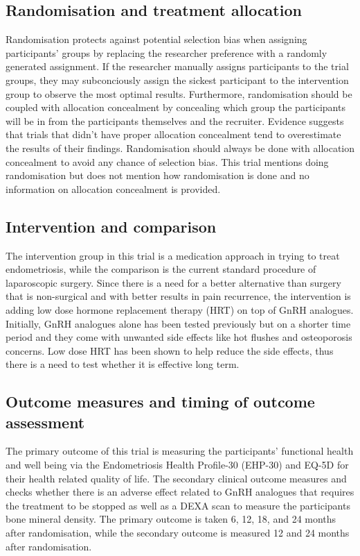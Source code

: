\documentclass{article}
\begin{document}
\subsection{Randomisation and treatment allocation}
Randomisation protects against potential selection bias when assigning participants' groups by replacing the researcher preference with a randomly generated assignment. If the researcher manually assigns participants to the trial groups, they may subconciously assign the sickest participant to the intervention group to observe the most optimal results. Furthermore, randomisation should be coupled with allocation concealment by concealing which group the participants will be in from the participants themselves and the recruiter. Evidence suggests that trials that didn't have proper allocation concealment tend to overestimate the results of their findings\autocite{allocation-concealment}. Randomisation should always be done with allocation concealment to avoid any chance of selection bias. This trial mentions doing randomisation but does not mention how randomisation is done and no information on allocation concealment is provided.

\subsection{Intervention and comparison}
The intervention group in this trial is a medication approach in trying to treat endometriosis, while the comparison is the current standard procedure of laparoscopic surgery. Since there is a need for a better alternative than surgery that is non-surgical and with better results in pain recurrence, the intervention is adding low dose hormone replacement therapy (HRT) on top of GnRH analogues. Initially, GnRH analogues alone has been tested previously but on a shorter time period and they come with unwanted side effects like hot flushes and osteoporosis concerns. Low dose HRT has been shown to help reduce the side effects, thus there is a need to test whether it is effective long term.

\subsection{Outcome measures and timing of outcome assessment}
The primary outcome of this trial is measuring the participants' functional health and well being via the Endometriosis Health Profile-30 (EHP-30) and EQ-5D for their health related quality of life. The secondary clinical outcome measures and checks whether there is an adverse effect related to GnRH analogues that requires the treatment to be stopped as well as a DEXA scan to measure the participants bone mineral density. The primary outcome is taken 6, 12, 18, and 24 months after randomisation, while the secondary outcome is measured 12 and 24 months after randomisation.
\end{document}
